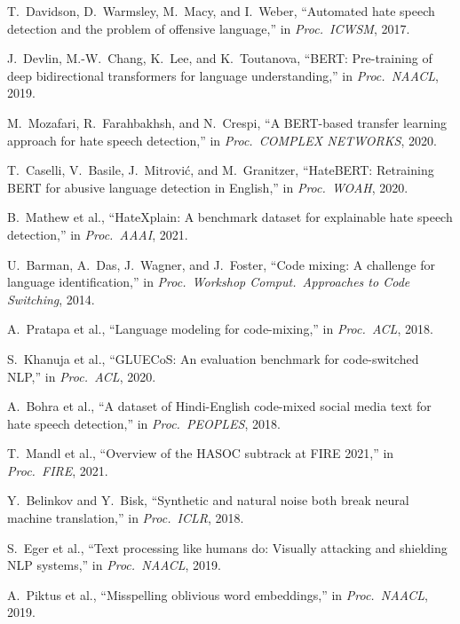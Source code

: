 \documentclass[12pt,a4paper]{report}
\begin{document}
\begin{enumerate}[leftmargin=*, label={[\arabic*]}]
  \item T.~Davidson, D.~Warmsley, M.~Macy, and I.~Weber, ``Automated hate speech detection and the problem of offensive language,'' in \textit{Proc.\ ICWSM}, 2017. \label{ref:davidson2017automated}
  \item J.~Devlin, M.-W.~Chang, K.~Lee, and K.~Toutanova, ``BERT: Pre-training of deep bidirectional transformers for language understanding,'' in \textit{Proc.\ NAACL}, 2019. \label{ref:devlin2019bert}
  \item M.~Mozafari, R.~Farahbakhsh, and N.~Crespi, ``A BERT-based transfer learning approach for hate speech detection,'' in \textit{Proc.\ COMPLEX NETWORKS}, 2020. \label{ref:mozafari2020bert}
  \item T.~Caselli, V.~Basile, J.~Mitrovi\'{c}, and M.~Granitzer, ``HateBERT: Retraining BERT for abusive language detection in English,'' in \textit{Proc.\ WOAH}, 2020. \label{ref:caselli2020hatebert}
  \item B.~Mathew et al., ``HateXplain: A benchmark dataset for explainable hate speech detection,'' in \textit{Proc.\ AAAI}, 2021.
  \item U.~Barman, A.~Das, J.~Wagner, and J.~Foster, ``Code mixing: A challenge for language identification,'' in \textit{Proc.\ Workshop Comput.\ Approaches to Code Switching}, 2014. \label{ref:barman2014code}
  \item A.~Pratapa et al., ``Language modeling for code-mixing,'' in \textit{Proc.\ ACL}, 2018. \label{ref:pratapa2018language}
  \item S.~Khanuja et al., ``GLUECoS: An evaluation benchmark for code-switched NLP,'' in \textit{Proc.\ ACL}, 2020. \label{ref:khanuja2020gluecos}
  \item A.~Bohra et al., ``A dataset of Hindi-English code-mixed social media text for hate speech detection,'' in \textit{Proc.\ PEOPLES}, 2018.
  \item T.~Mandl et al., ``Overview of the HASOC subtrack at FIRE 2021,'' in \textit{Proc.\ FIRE}, 2021.
  \item Y.~Belinkov and Y.~Bisk, ``Synthetic and natural noise both break neural machine translation,'' in \textit{Proc.\ ICLR}, 2018. \label{ref:belinkov2018synthetic}
  \item S.~Eger et al., ``Text processing like humans do: Visually attacking and shielding NLP systems,'' in \textit{Proc.\ NAACL}, 2019.
  \item A.~Piktus et al., ``Misspelling oblivious word embeddings,'' in \textit{Proc.\ NAACL}, 2019.

\end{enumerate}
\end{document}

